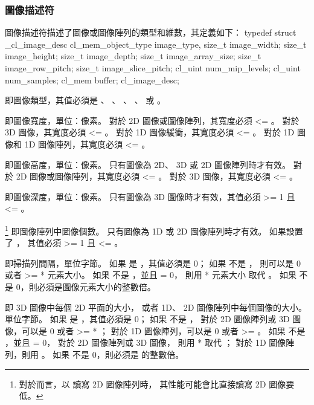 \subsubsection[section:imgDsc]{圖像描述符}

圖像描述符描述了圖像或圖像陣列的類型和維數，其定義如下：
\startclc
typedef struct _cl_image_desc {
	cl_mem_object_type	image_type,
	size_t			image_width;
	size_t			image_height;
	size_t			image_depth;
	size_t			image_array_size;
	size_t			image_row_pitch;
	size_t			image_slice_pitch;
	cl_uint			num_mip_levels;
	cl_uint			num_samples;
	cl_mem			buffer;
} cl_image_desc;
\stopclc

 即圖像類型，其值必須是 、
、 、
、 
或 。

 即圖像寬度，單位：像素。
對於 2D 圖像或圖像陣列，其寬度必須 <= 。
對於 3D 圖像，其寬度必須 <= 。
對於 1D 圖像緩衝，其寬度必須 <= 。
對於 1D 圖像和 1D 圖像陣列，其寬度必須 <= 。

 即圖像高度，單位：像素。
只有圖像為 2D、 3D 或 2D 圖像陣列時才有效。
對於 2D 圖像或圖像陣列，其寬度必須 <= 。
對於 3D 圖像，其寬度必須 <= 。

 即圖像深度，單位：像素。
只有圖像為 3D 圖像時才有效，其值必須 >= 1 且 <= 。

\footnote{%
對於而言，以  讀寫 2D 圖像陣列時，
其性能可能會比直接讀寫 2D 圖像要低。%
} 即圖像陣列中圖像個數。
只有圖像為 1D 或 2D 圖像陣列時才有效。
如果設置了 ，
其值必須 >= 1 且 <= 。

 即掃描列間隔，單位字節。
如果  是 ，其值必須是 0；
如果  不是 ，
則可以是 0 或者 >=  * 元素大小。
如果  不是 ，並且  = 0，
則用  * 元素大小 取代 。
如果  不是 0，則必須是圖像元素大小的整數倍。

 即 3D 圖像中每個 2D 平面的大小，
或者 1D、 2D 圖像陣列中每個圖像的大小。單位字節。
如果  是 ，其值必須是 0；
如果  不是 ，
對於 2D 圖像陣列或 3D 圖像，可以是 0 或者 >=  * ；
對於 1D 圖像陣列，可以是 0 或者 >= 。
如果  不是 ，並且  = 0，
對於 2D 圖像陣列或 3D 圖像，
則用  *  取代 ；
對於 1D 圖像陣列，則用 。
如果  不是 0，則必須是  的整數倍。

